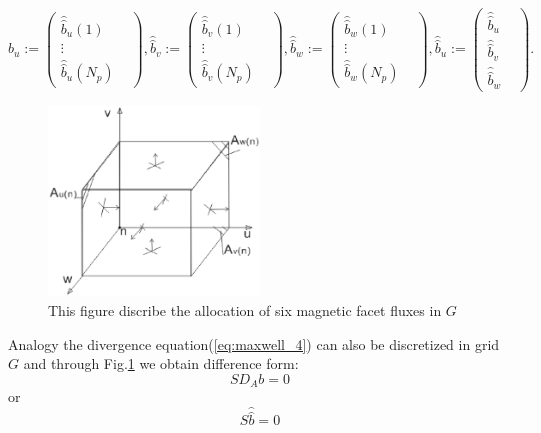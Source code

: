 \begin{equation}
\widehat{\widehat{b}}_{u}:=
\begin{pmatrix}
\widehat{\widehat{b}}_{u}(1)&\\
\vdots&\\
\widehat{\widehat{b}}_{u}(N_{p})&
\end{pmatrix},
\widehat{\widehat{b}}_{v}:=
\begin{pmatrix}
\widehat{\widehat{b}}_{v}(1)&\\
\vdots&\\
\widehat{\widehat{b}}_{v}(N_{p})&
\end{pmatrix},
\widehat{\widehat{b}}_{w}:=
\begin{pmatrix}
\widehat{\widehat{b}}_{w}(1)&\\
\vdots&\\
\widehat{\widehat{b}}_{w}(N_{p})&
\end{pmatrix},
\widehat{\widehat{b}}_{u}:=
\begin{pmatrix}
\widehat{\widehat{b}}_{u}&\\
\widehat{\widehat{b}}_{v}&\\
\widehat{\widehat{b}}_{w}&
\end{pmatrix}.
\label{eq:vector_m_flux}
\end{equation}
\begin{figure}
\centering
\includegraphics[width=0.5\textwidth]{bilder/divergence_in_grid}
\caption{This figure discribe the allocation of six magnetic facet fluxes in $G$}
\label{fig:divergence_G}
\end{figure}
Analogy the divergence equation(\ref{eq:maxwell_4}) can also be discretized in grid $G$ and through Fig.\ref{fig:divergence_G} we obtain difference form: 
\begin{equation}
SD_{A}b=0
\label{eq:divergence_sample}
\end{equation}
or
\begin{equation}
S\widehat{\widehat{b}}=0
\label{eq:divergence_integral}
\end{equation}
